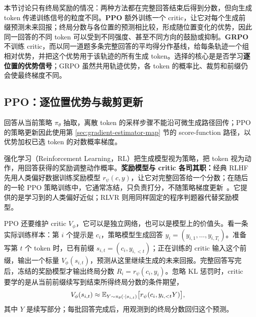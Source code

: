 \begin{keybox}
本节讨论只有终局奖励的情况：两种方法都在完整回答结束后得到分数，但向生成 token 传递训练信号的粒度不同。\textbf{PPO} 额外训练一个 critic，让它对每个生成前缀预测未来回报；终局分数与各位置的预测相比较，形成随位置变化的优势，因此同一回答的不同 token 可以受到不同强度、甚至不同方向的鼓励或抑制。\textbf{GRPO} 不训练 critic，而以同一道题多条完整回答的平均得分作基线，给每条轨迹一个组相对优势，并把这个优势用于该轨迹的所有生成 token。选择的核心是是否学习\textbf{逐位置的优势信号}；GRPO 虽然共用轨迹优势，各 token 的概率比、裁剪和前缀仍会使最终梯度不同。
\end{keybox}

\subsection{PPO：逐位置优势与裁剪更新}

回答从当前策略 \(\pi_\theta\) 抽取，离散 token 的采样步骤不能沿可微生成路径回传；PPO 的策略更新因此使用第 \ref{sec:gradient-estimator-map} 节的 score-function 路径，以优势加权已选 token 的对数概率梯度。

强化学习（Reinforcement Learning，RL）把生成模型视为策略，把 token 视为动作，用回答获得的奖励调整动作概率。\textbf{奖励模型与 critic 各司其职：}经典 RLHF 先用人类偏好数据训练奖励模型 \(r_\psi(c,y)\)，让它对完整回答给一个分数；在随后的一轮 PPO 策略训练中，它通常冻结，只负责打分，不随策略梯度更新~\cite{stiennon2020learning,ouyang2022instructgpt}。它提供的是学习到的人类偏好近似；RLVR 则用同样固定的程序判题器代替奖励模型。

PPO 还要维护 critic \(V_\phi\)，它可以是独立网络，也可以是模型上的价值头。看一条实际训练样本：第 \(i\) 个提示是 \(c_i\)，策略模型生成回答 \(y_i=(y_{i,1},\ldots,y_{i,T_i})\)。准备写第 \(t\) 个 token 时，已有前缀 \(s_{i,t}=(c_i,y_{i,<t})\)；正在训练的 critic 输入这个前缀，输出一个标量 \(V_\phi(s_{i,t})\)，预测从这里继续生成的未来回报。完整回答写完后，冻结的奖励模型才输出终局分数 \(R_i=r_\psi(c_i,y_i)\)。忽略 KL 惩罚时，critic 要学的是从当前前缀续写到结束所得终局分数的条件期望，
\begin{equation}
 V_\phi(s_{i,t})\approx
 \mathbb{E}_{Y\sim\pi_\theta(\cdot\mid s_{i,t})}
 \bigl[r_\psi(c_i,y_{i,<t}Y)\bigr],
 \label{eq:ppo-critic-target}
\end{equation}
其中 \(Y\) 是续写部分；每批回答完成后，用观测到的终局分数回归这个预测。

